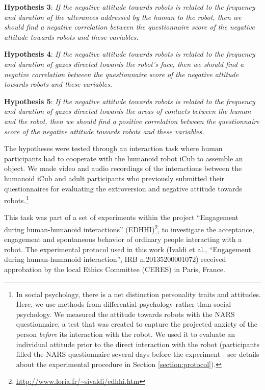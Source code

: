 \documentclass[twocolumn]{svjour3}          %
\begin{document}
\textbf{Hypothesis 3}: 
\textit{If the negative attitude towards robots is related to the frequency and duration of the utterances addressed by the human to the robot, then we should find a negative correlation between the questionnaire score of the negative attitude towards robots and these variables.}

\textbf{Hypothesis 4}: 
\textit{If the negative attitude towards robots is related to the frequency and duration of gazes directed towards the robot's face, then we should find a negative correlation between the questionnaire score of the negative attitude towards robots and these variables.}

\textbf{Hypothesis 5}: 
\textit{If the negative attitude towards robots is related to the frequency and duration of gazes directed towards the areas of contacts between the human and the robot, then we should find a positive correlation between the questionnaire score of the negative attitude towards robots and these variables.}

\medskip
The hypotheses were tested through an interaction task where human participants had to cooperate with the humanoid robot iCub \cite{icub2013} to assemble an object. We made video and audio recordings of the interactions between the humanoid iCub and adult participants who previously submitted their questionnaires for evaluating the extroversion and negative attitude towards robots.\footnote{In social psychology, there is a net distinction personality traits and attitudes. Here, we use methods from differential psychology rather than social psychology. We measured the attitude towards robots with the NARS questionnaire, a test that was created to capture the projected anxiety of the person \textit{before} its interaction with the robot. We used it to evaluate an individual attitude prior to the direct interaction with the robot (participants filled the NARS questionnaire several days before the experiment - see details about the experimental procedure in Section \ref{section:protocol}).}

This task was part of a set of experiments within the project ``Engagement during human-humanoid interactions'' (EDHHI)\footnote{\url{http://www.loria.fr/~sivaldi/edhhi.htm}}, to investigate the acceptance, engagement and spontaneous behavior of ordinary people interacting with a robot.
The experimental protocol used in this work (Ivaldi et al., ``Engagement during human-humanoid interaction'', IRB n.20135200001072) received approbation by the local Ethics Committee (CERES) in Paris, France.
\end{document}
